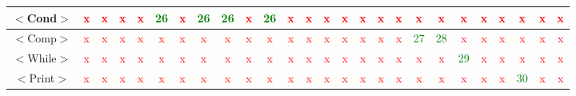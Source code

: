 \documentclass{article}
\begin{document}
\begin{center}
\begin{table}[H]
\begin{tabular}{|c|c|c|c|c|c|c|c|c|c|c|c|c|c|c|c|c|c|c|c|c|c|c|c|c|c|}
\hline
 $<$Cond$>$         & \textcolor{red}{x}    & \textcolor{red}{x}  & \textcolor{red}{x}    & \textcolor{red}{x}    & \textcolor{green}{26}  & \textcolor{red}{x}  & \textcolor{green}{26}  & \textcolor{green}{26}  & \textcolor{red}{x}    & \textcolor{green}{26}  & \textcolor{red}{x}     & \textcolor{red}{x}     & \textcolor{red}{x}     & \textcolor{red}{x}     & \textcolor{red}{x}  & \textcolor{red}{x}     & \textcolor{red}{x}     & \textcolor{red}{x}     & \textcolor{red}{x}     & \textcolor{red}{x}     & \textcolor{red}{x}  & \textcolor{red}{x}    & \textcolor{red}{x}     & \textcolor{red}{x}      & \textcolor{red}{x} \\
\hline
 $<$Comp$>$         & \textcolor{red}{x}    & \textcolor{red}{x}  & \textcolor{red}{x}    & \textcolor{red}{x}    & \textcolor{red}{x}     & \textcolor{red}{x}  & \textcolor{red}{x}     & \textcolor{red}{x}     & \textcolor{red}{x}    & \textcolor{red}{x}     & \textcolor{red}{x}     & \textcolor{red}{x}     & \textcolor{red}{x}     & \textcolor{red}{x}     & \textcolor{red}{x}  & \textcolor{red}{x}     & \textcolor{red}{x}     & \textcolor{green}{27}  & \textcolor{green}{28}  & \textcolor{red}{x}     & \textcolor{red}{x}  & \textcolor{red}{x}    & \textcolor{red}{x}     & \textcolor{red}{x}     & \textcolor{red}{x} \\
\hline
 $<$While$>$        & \textcolor{red}{x}    & \textcolor{red}{x}  & \textcolor{red}{x}    & \textcolor{red}{x}    & \textcolor{red}{x}     & \textcolor{red}{x}  & \textcolor{red}{x}     & \textcolor{red}{x}     & \textcolor{red}{x}    & \textcolor{red}{x}     & \textcolor{red}{x}     & \textcolor{red}{x}     & \textcolor{red}{x}     & \textcolor{red}{x}     & \textcolor{red}{x}  & \textcolor{red}{x}     & \textcolor{red}{x}     & \textcolor{red}{x}     & \textcolor{red}{x}     & \textcolor{green}{29}  & \textcolor{red}{x}  & \textcolor{red}{x}    & \textcolor{red}{x}     & \textcolor{red}{x}      & \textcolor{red}{x} \\
\hline
 $<$Print$>$        & \textcolor{red}{x}    & \textcolor{red}{x}  & \textcolor{red}{x}    & \textcolor{red}{x}    & \textcolor{red}{x}     & \textcolor{red}{x}  & \textcolor{red}{x}     & \textcolor{red}{x}     & \textcolor{red}{x}    & \textcolor{red}{x}     & \textcolor{red}{x}     & \textcolor{red}{x}     & \textcolor{red}{x}     & \textcolor{red}{x}     & \textcolor{red}{x}  & \textcolor{red}{x}     & \textcolor{red}{x}     & \textcolor{red}{x}     & \textcolor{red}{x}     & \textcolor{red}{x}     & \textcolor{red}{x}  & \textcolor{red}{x}    & \textcolor{green}{30}  & \textcolor{red}{x}      & \textcolor{red}{x} \\

\end{tabular}
\end{table}
\end{center}
\end{document}
